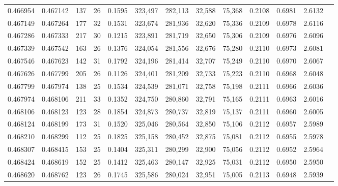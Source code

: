 \begin{tabular}{rrrrrrrrrrrrr}
0.466954 & 0.467142 &   137 &  26 &                                     0.1595 & 323,497 & 282,113 &  32,588 &  75,368 & 0.2108 & 0.6981 & 2.6132 \\
0.467149 & 0.467264 &   177 &  32 &                                     0.1531 & 323,674 & 281,936 &  32,620 &  75,336 & 0.2109 & 0.6978 & 2.6116 \\
0.467286 & 0.467333 &   217 &  30 &                                     0.1215 & 323,891 & 281,719 &  32,650 &  75,306 & 0.2109 & 0.6976 & 2.6096 \\
0.467339 & 0.467542 &   163 &  26 &                                     0.1376 & 324,054 & 281,556 &  32,676 &  75,280 & 0.2110 & 0.6973 & 2.6081 \\
0.467546 & 0.467623 &   142 &  31 &                                     0.1792 & 324,196 & 281,414 &  32,707 &  75,249 & 0.2110 & 0.6970 & 2.6067 \\
0.467626 & 0.467799 &   205 &  26 &                                     0.1126 & 324,401 & 281,209 &  32,733 &  75,223 & 0.2110 & 0.6968 & 2.6048 \\
0.467799 & 0.467974 &   138 &  25 &                                     0.1534 & 324,539 & 281,071 &  32,758 &  75,198 & 0.2111 & 0.6966 & 2.6036 \\
0.467974 & 0.468106 &   211 &  33 &                                     0.1352 & 324,750 & 280,860 &  32,791 &  75,165 & 0.2111 & 0.6963 & 2.6016 \\
0.468106 & 0.468123 &   123 &  28 &                                     0.1854 & 324,873 & 280,737 &  32,819 &  75,137 & 0.2111 & 0.6960 & 2.6005 \\
0.468124 & 0.468199 &   173 &  31 &                                     0.1520 & 325,046 & 280,564 &  32,850 &  75,106 & 0.2112 & 0.6957 & 2.5989 \\
0.468210 & 0.468299 &   112 &  25 &                                     0.1825 & 325,158 & 280,452 &  32,875 &  75,081 & 0.2112 & 0.6955 & 2.5978 \\
0.468307 & 0.468415 &   153 &  25 &                                     0.1404 & 325,311 & 280,299 &  32,900 &  75,056 & 0.2112 & 0.6952 & 2.5964 \\
0.468424 & 0.468619 &   152 &  25 &                                     0.1412 & 325,463 & 280,147 &  32,925 &  75,031 & 0.2112 & 0.6950 & 2.5950 \\
0.468620 & 0.468762 &   123 &  26 &                                     0.1745 & 325,586 & 280,024 &  32,951 &  75,005 & 0.2113 & 0.6948 & 2.5939 \\

\end{tabular}
